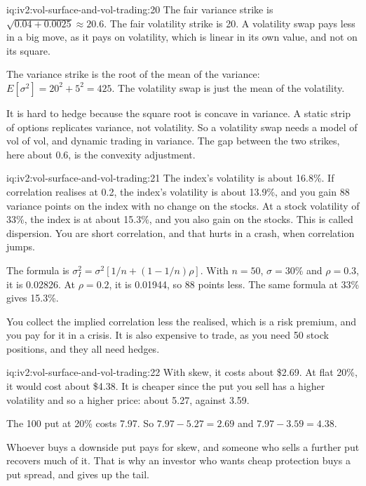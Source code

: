 \begin{solution}{iq:iv2:vol-surface-and-vol-trading:20}
The fair variance strike is $\sqrt{0.04 + 0.0025} \approx 20.6$. The fair volatility strike is 20. A volatility swap pays less in a big move, as it pays on volatility, which is linear in its own value, and not on its square.

The variance strike is the root of the mean of the variance: $E[\sigma^2] = 20^2 + 5^2 = 425$. The volatility swap is just the mean of the volatility.

It is hard to hedge because the square root is concave in variance. A static strip of options replicates variance, not volatility. So a volatility swap needs a model of vol of vol, and dynamic trading in variance. The gap between the two strikes, here about 0.6, is the convexity adjustment.

\end{solution}

\begin{solution}{iq:iv2:vol-surface-and-vol-trading:21}
The index's volatility is about 16.8\%. If correlation realises at 0.2, the index's volatility is about 13.9\%, and you gain 88 variance points on the index with no change on the stocks. At a stock volatility of 33\%, the index is at about 15.3\%, and you also gain on the stocks. This is called dispersion. You are short correlation, and that hurts in a crash, when correlation jumps.

The formula is $\sigma_I^2 = \sigma^2[1/n + (1 - 1/n)\rho]$. With $n = 50$, $\sigma = 30\%$ and $\rho = 0.3$, it is 0.02826. At $\rho = 0.2$, it is 0.01944, so 88 points less. The same formula at 33\% gives 15.3\%.

You collect the implied correlation less the realised, which is a risk premium, and you pay for it in a crisis. It is also expensive to trade, as you need 50 stock positions, and they all need hedges.

\end{solution}

\begin{solution}{iq:iv2:vol-surface-and-vol-trading:22}
With skew, it costs about \$2.69. At flat 20\%, it would cost about \$4.38. It is cheaper since the put you sell has a higher volatility and so a higher price: about 5.27, against 3.59.

The 100 put at 20\% costs 7.97. So $7.97 - 5.27 = 2.69$ and $7.97 - 3.59 = 4.38$.

Whoever buys a downside put pays for skew, and someone who sells a further put recovers much of it. That is why an investor who wants cheap protection buys a put spread, and gives up the tail.

\end{solution}

